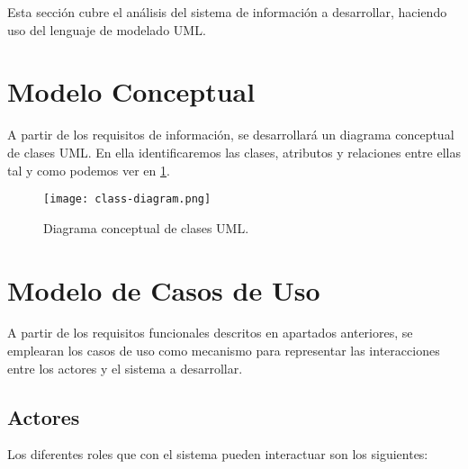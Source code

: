 

Esta sección cubre el análisis del sistema de información a desarrollar, haciendo uso del lenguaje de modelado UML.

\section{Modelo Conceptual}
A partir de los requisitos de información, se desarrollará un diagrama conceptual de clases UML. En ella identificaremos las clases, atributos y relaciones entre ellas tal y como podemos ver en \ref{fig:digclases}.

\begin{figure}[h!]
	\begin{center} 
		\texttt{[image: class-diagram.png]}
		\caption{Diagrama conceptual de clases UML.}
		\label{fig:digclases}
	\end{center}
\end{figure}


\section{Modelo de Casos de Uso}
A partir de los requisitos funcionales descritos en apartados anteriores, se emplearan los casos de uso como mecanismo para representar las interacciones entre los actores y el sistema a desarrollar.

\subsection{Actores} 
Los diferentes roles que con el sistema pueden interactuar son los siguientes:

